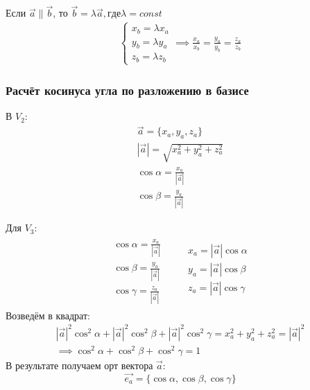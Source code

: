 Если $\vec{a} \parallel \vec{b}$, то $\vec{b} = \lambda \vec{a}, где \lambda = const$
\begin{gather*}
  \begin{cases}
    x_b = \lambda x_a \\
    y_b = \lambda y_a \\
    z_b = \lambda z_b
  \end{cases}
  \implies 
  \frac{x_a}{x_b} = \frac{y_a}{y_b} = \frac{z_a}{z_b}
\end{gather*}

\subsubsection*{Расчёт косинуса угла по разложению в базисе}

\begin{eg}
  В $V_2$:
  \begin{gather*}
    \vec{a} = \{x_a, y_a, z_a\} \\
    |\vec{a}| = \sqrt{x_a^2 + y_a^2 + z_a^2} \\
    \cos \alpha = \frac{x_a}{|\vec{a}|} \\
    \cos \beta = \frac{y_a}{|\vec{a}|}
  \end{gather*}
\end{eg}

\begin{eg}
  Для $V_3$: \\
  \begin{gather*}
    \begin{matrix}
      \cos \alpha = \frac{x_a}{|\vec{a}|} \\
      \cos \beta = \frac{y_a}{|\vec{a}|} \\
      \cos \gamma = \frac{z_a}{|\vec{a}|}
    \end{matrix}
    \qquad
    \begin{matrix}
      x_a = |\vec{a}| \cos \alpha \\
      y_a = |\vec{a}| \cos \beta \\
      z_a = |\vec{a}| \cos \gamma \\
    \end{matrix}
  \end{gather*}
  Возведём в квадрат:
  \begin{gather*}
    |\vec{a}|^2 \cos^2 \alpha + |\vec{a}|^2 \cos^2 \beta + |\vec{a}|^2 \cos^2 \gamma = x_a^2 + y_a^2 + z_a^2 = |\vec{a}|^2 \\
    \implies \cos^2 \alpha + \cos^2 \beta + \cos^2 \gamma = 1
  \end{gather*}
  В результате получаем орт вектора $\vec{a}$: \[
  \vec{e_a} = \{\cos \alpha, \cos \beta, \cos \gamma\} 
  \] 
\end{eg}

